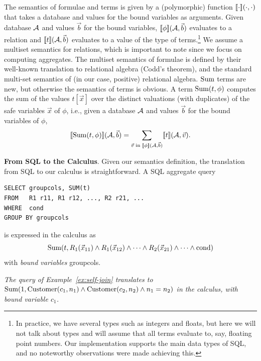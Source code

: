 The semantics of formulae and terms is given by a (polymorphic) function
$\lbrack\!\lbrack\cdot\rbrack\!\rbrack(\cdot, \cdot)$ that takes a database and values for the
bound variables as arguments. Given database $\db$ and values $\vec{b}$ for
the bound variables,
$\Bracks{\phi}(\db, \vec{b})$ evaluates to a relation and
$\Bracks{t}(\db, \vec{b})$ evaluates to a value of the type of
terms.\footnote{In practice,
we have several types such as integers and floats, but
here we will not talk about types and will assume that all terms evaluate to,
say, floating point numbers. Our implementation supports the
main data types of SQL, and no noteworthy observations were made achieving
this.}
We assume a multiset semantics for relations, which is important to note
since we focus on computing aggregates. The multiset semantics of formulae
is defined by their well-known translation to relational algebra
(Codd's theorem), and the standard multi-set semantics of
(in our case, positive) relational algebra. 
$\mbox{Sum}$ terms are new, but otherwise the
semantics of terms is obvious.
A term $\mbox{Sum}(t, \phi)$
computes the sum of the values $t[\vec{x}]$
over the distinct valuations (with duplicates)
of the safe variables $\vec{x}$ of $\phi$, i.e.,
given a database $\db$ and values $\vec{b}$ for the bound variables of $\phi$,
\[
\Bracks{\AggSum(t, \phi)}(\db, \vec{b}) =
\sum_{\vec{v} \;\mathrm{in}\; \Bracks{\phi}(\db, \vec{b})} \Bracks{t}(\db, \vec{v}).
\]


{\bf From SQL to the Calculus}.
Given our semantics definition, the translation from SQL to our calculus is
straightforward.
%
%
A SQL aggregate query
\begin{verbatim}
SELECT groupcols, SUM(t)
FROM   R1 r11, R1 r12, ..., R2 r21, ...
WHERE  cond
GROUP BY groupcols
\end{verbatim}
is expressed in the calculus as
\[
\mbox{Sum}(t, R_1(\vec{x}_{11}) \land R_1(\vec{x}_{12}) \land \dots
\land R_2(\vec{x}_{21}) \land \dots \land \mbox{cond})
\]
with {\em bound variables} groupcols.


\begin{example}\em
\label{ex:self-join-calc}
The query of Example~\ref{ex:self-join} translates to
$\mbox{Sum}(1, \mbox{Customer}(c_1,n_1) \land \mbox{Customer}(c_2, n_2) \land
n_1=n_2)$ in the calculus, with bound variable $c_1$.
\punto
\end{example}

